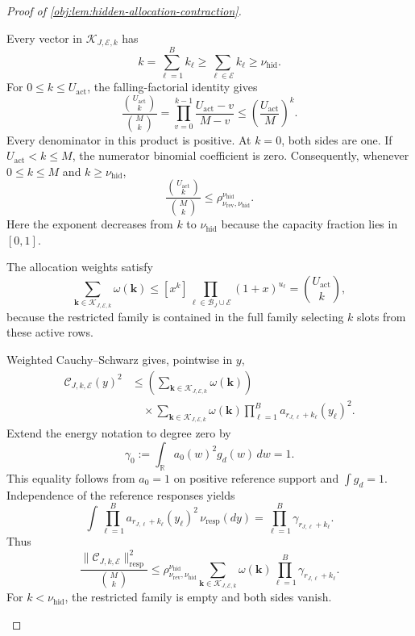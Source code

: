 \begin{proof}[Proof of \cref{obj:lem:hidden-allocation-contraction}]
\begin{enumerate}
Every vector in \(\mathscr K_{J,\mathcal E,k}\) has
\[
k=\sum_{\ell=1}^B k_\ell
\ge\sum_{\ell\in\mathcal E}k_\ell
\ge\nu_{\mathrm{hid}}.
\]
For \(0\le k\le U_{\mathrm{act}}\), the falling-factorial identity gives
\[
\frac{\binom{U_{\mathrm{act}}}{k}}{\binom Mk}
=
\prod_{v=0}^{k-1}
\frac{U_{\mathrm{act}}-v}{M-v}
\le
\left(\frac{U_{\mathrm{act}}}{M}\right)^k.
\]
Every denominator in this product is positive. At \(k=0\), both sides are one. If \(U_{\mathrm{act}}<k\le M\), the numerator binomial coefficient is zero. Consequently, whenever \(0\le k\le M\) and \(k\ge\nu_{\mathrm{hid}}\),
\[
\frac{\binom{U_{\mathrm{act}}}{k}}{\binom Mk}
\le
\rho_{\nu_{\mathrm{rev}},\nu_{\mathrm{hid}}}^{\nu_{\mathrm{hid}}}.
\]
Here the exponent decreases from \(k\) to \(\nu_{\mathrm{hid}}\) because the capacity fraction lies in \([0,1]\).

The allocation weights satisfy
\[
\sum_{\boldsymbol k\in\mathscr K_{J,\mathcal E,k}}
\omega(\boldsymbol k)
\le
[x^k]\prod_{\ell\in\mathcal B_J\cup\mathcal E}(1+x)^{u_\ell}
=
\binom{U_{\mathrm{act}}}{k},
\]
because the restricted family is contained in the full family selecting \(k\) slots from these active rows.

Weighted Cauchy--Schwarz gives, pointwise in \(y\),
\[
\begin{aligned}
\mathcal C_{J,k,\mathcal E}(y)^2
&\le
\left(
\sum_{\boldsymbol k\in\mathscr K_{J,\mathcal E,k}}
\omega(\boldsymbol k)
\right)
\\
&\quad{}\times
\sum_{\boldsymbol k\in\mathscr K_{J,\mathcal E,k}}
\omega(\boldsymbol k)
\prod_{\ell=1}^B
a_{r_{J,\ell}+k_\ell}(y_\ell)^2.
\end{aligned}
\]
Extend the energy notation to degree zero by
\[
\gamma_0:=
\int_{\mathbb R}a_0(w)^2g_d(w)\,dw=1.
\]
This equality follows from \(a_0=1\) on positive reference support and \(\int g_d=1\).
Independence of the reference responses yields
\[
\int
\prod_{\ell=1}^B
a_{r_{J,\ell}+k_\ell}(y_\ell)^2\,
\nu_{\mathrm{resp}}(dy)
=
\prod_{\ell=1}^B\gamma_{r_{J,\ell}+k_\ell}.
\]
Thus
\[
\frac{\|\mathcal C_{J,k,\mathcal E}\|_{\mathrm{resp}}^2}{\binom Mk}
\le
\rho_{\nu_{\mathrm{rev}},\nu_{\mathrm{hid}}}^{\nu_{\mathrm{hid}}}
\sum_{\boldsymbol k\in\mathscr K_{J,\mathcal E,k}}
\omega(\boldsymbol k)
\prod_{\ell=1}^B\gamma_{r_{J,\ell}+k_\ell}.
\]
For \(k<\nu_{\mathrm{hid}}\), the restricted family is empty and both sides vanish.


\end{enumerate}
\end{proof}
